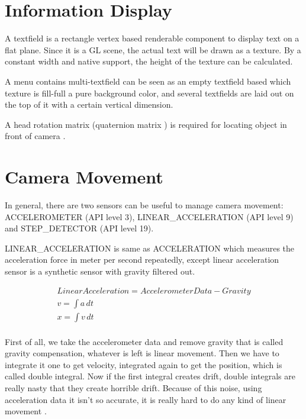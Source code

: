 \section{Information Display}

A textfield is a rectangle vertex based renderable component to display text on a flat plane. Since it is a GL scene, the actual text will be drawn as a texture. By a constant width and native  support, the height of the texture can be calculated. 

A menu contains multi-textfield can be seen as an empty textfield based which texture is fill-full a pure background color, and several  textfields are laid out on the top of it with a certain vertical dimension.

A head rotation matrix (quaternion matrix \parencite{jvv.quaternions.2013}) is required for locating object in front of camera \parencite{mathworks.quaternion-rotation.2016}.

\section{Camera Movement}

In general, there are two sensors can be useful to manage camera movement: ACCELEROMETER (API level 3), LINEAR\_ACCELERATION (API level 9) and STEP\_DETECTOR (API level 19). 

LINEAR\_ACCELERATION is same as ACCELERATION which measures the acceleration force in meter per second repeatedly, except linear acceleration sensor is a synthetic sensor with gravity filtered out. 

\[
\begin{array}{lr}
Linear Acceleration = Accelerometer Data - Gravity\\
v = \int a\,dt\\
x = \int v\,dt\\
\end{array}
\]

First of all, we take the accelerometer data and remove gravity that is called gravity compensation, whatever is left is linear movement. Then we have to integrate it one to get velocity, integrated again to get the position, which is called double integral. Now if the first integral creates drift, double integrals are really nasty that they create horrible drift. Because of this noise, using acceleration data it isn't so accurate, it is really hard to do any kind of linear movement \parencite{GoogleTechTalks.sensor-fusion.2010}.

